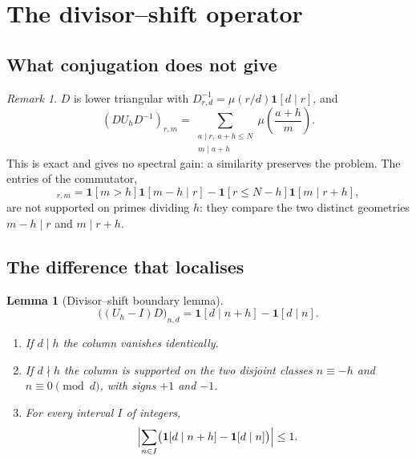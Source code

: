 \documentclass[11pt]{amsart}
\numberwithin{equation}{section}
\theoremstyle{plain}
\newtheorem{lemma}[theorem]{Lemma}
\theoremstyle{definition}
\theoremstyle{remark}
\newtheorem{remark}[theorem]{Remark}
\begin{document}
\section{The divisor--shift operator}
\label{sec:divisor_shift}

\subsection{What conjugation does not give}
\label{subsec:conjugation}

\begin{remark}
\label{rem:conjugation_nogo}
$D$ is lower triangular with $D^{-1}_{r,d}=\mu(r/d)\mathbf 1[d\mid r]$,
and
\begin{equation}
(DU_hD^{-1})_{r,m}
=\sum_{\substack{a\mid r,\ a+h\le N\\ m\mid a+h}}
\mu\!\left(\frac{a+h}{m}\right).
\label{eq:conjugated_shift}
\end{equation}
This is exact and gives no spectral gain: a similarity preserves the
problem. The entries of the commutator,
\begin{equation}
[D,U_h]_{r,m}=\mathbf 1[m>h]\mathbf 1[m-h\mid r]
-\mathbf 1[r\le N-h]\mathbf 1[m\mid r+h],
\label{eq:commutator}
\end{equation}
are not supported on primes dividing $h$: they compare the two distinct
geometries $m-h\mid r$ and $m\mid r+h$.
\end{remark}

\subsection{The difference that localises}
\label{subsec:boundary_lemma}

\begin{lemma}[Divisor--shift boundary lemma]
\label{lem:boundary}
\begin{equation}
\bigl((U_h-I)D\bigr)_{n,d}=\mathbf 1[d\mid n+h]-\mathbf 1[d\mid n].
\label{eq:boundary_lemma}
\end{equation}
\begin{enumerate}[label=(\roman*)]
\item If $d\mid h$ the column vanishes identically.
\item If $d\nmid h$ the column is supported on the two disjoint classes
$n\equiv-h$ and $n\equiv0\pmod d$, with signs $+1$ and $-1$.
\item For every interval $I$ of integers,
\begin{equation}
\Bigl|\sum_{n\in I}\bigl(\mathbf 1[d\mid n+h]-\mathbf 1[d\mid n]\bigr)\Bigr|
\le 1 .
\label{eq:boundary_mass}
\end{equation}
\end{enumerate}
\end{lemma}
\end{document}
